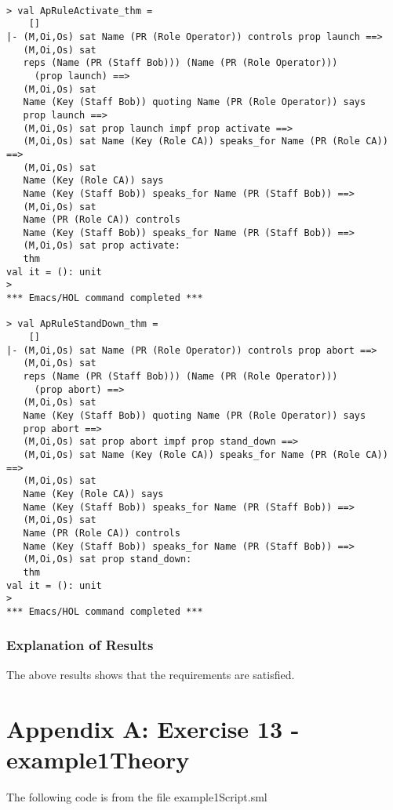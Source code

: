 \documentclass{report}
\begin{document}
\begin{session}
  \begin{scriptsize}
\begin{verbatim}

> val ApRuleActivate_thm =
    []
|- (M,Oi,Os) sat Name (PR (Role Operator)) controls prop launch ==>
   (M,Oi,Os) sat
   reps (Name (PR (Staff Bob))) (Name (PR (Role Operator)))
     (prop launch) ==>
   (M,Oi,Os) sat
   Name (Key (Staff Bob)) quoting Name (PR (Role Operator)) says
   prop launch ==>
   (M,Oi,Os) sat prop launch impf prop activate ==>
   (M,Oi,Os) sat Name (Key (Role CA)) speaks_for Name (PR (Role CA)) ==>
   (M,Oi,Os) sat
   Name (Key (Role CA)) says
   Name (Key (Staff Bob)) speaks_for Name (PR (Staff Bob)) ==>
   (M,Oi,Os) sat
   Name (PR (Role CA)) controls
   Name (Key (Staff Bob)) speaks_for Name (PR (Staff Bob)) ==>
   (M,Oi,Os) sat prop activate:
   thm
val it = (): unit
> 
*** Emacs/HOL command completed ***

> val ApRuleStandDown_thm =
    []
|- (M,Oi,Os) sat Name (PR (Role Operator)) controls prop abort ==>
   (M,Oi,Os) sat
   reps (Name (PR (Staff Bob))) (Name (PR (Role Operator)))
     (prop abort) ==>
   (M,Oi,Os) sat
   Name (Key (Staff Bob)) quoting Name (PR (Role Operator)) says
   prop abort ==>
   (M,Oi,Os) sat prop abort impf prop stand_down ==>
   (M,Oi,Os) sat Name (Key (Role CA)) speaks_for Name (PR (Role CA)) ==>
   (M,Oi,Os) sat
   Name (Key (Role CA)) says
   Name (Key (Staff Bob)) speaks_for Name (PR (Staff Bob)) ==>
   (M,Oi,Os) sat
   Name (PR (Role CA)) controls
   Name (Key (Staff Bob)) speaks_for Name (PR (Staff Bob)) ==>
   (M,Oi,Os) sat prop stand_down:
   thm
val it = (): unit
> 
*** Emacs/HOL command completed ***
\end{verbatim}
  \end{scriptsize}
\end{session}


\subsection{Explanation of Results}
\label{sec:explanation-results-3}
The above results shows that the requirements are satisfied.


\chapter{Appendix A: Exercise 13 - example1Theory}
\label{cha:appendix-a:chapter13}

The following code is from the file example1Script.sml

\end{document}

